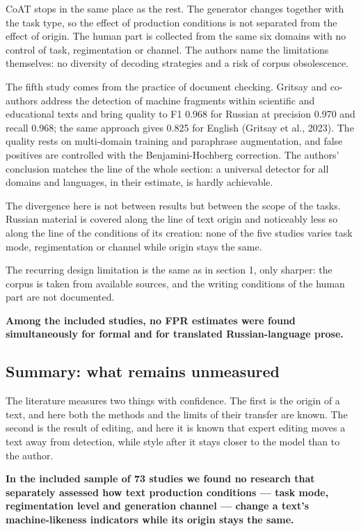 \documentclass[11pt,a4paper]{article}
\renewcommand{\_}{\textunderscore\allowbreak}
\begin{document}
CoAT stops in the same place as the rest. The generator changes together with
the task type, so the effect of production conditions is not separated from the
effect of origin. The human part is collected from the same six domains with no
control of task, regimentation or channel. The authors name the limitations
themselves: no diversity of decoding strategies and a risk of corpus obsolescence.

The fifth study comes from the practice of document checking. Gritsay and
co-authors address the detection of machine fragments within scientific and
educational texts and bring quality to F1 0.968 for Russian at precision 0.970
and recall 0.968; the same approach gives 0.825 for English (Gritsay et al., 2023). The quality rests on multi-domain training and
paraphrase augmentation, and false positives are controlled with the
Benjamini-Hochberg correction. The authors' conclusion matches the line of the
whole section: a universal detector for all domains and languages, in their
estimate, is hardly achievable.

The divergence here is not between results but between the scope of the tasks.
Russian material is covered along the line of text origin and noticeably less
so along the line of the conditions of its creation: none of the five studies
varies task mode, regimentation or channel while origin stays the same.

The recurring design limitation is the same as in section 1, only sharper: the
corpus is taken from available sources, and the writing conditions of the human
part are not documented.

\textbf{Among the included studies, no FPR estimates were found simultaneously for
formal and for translated Russian-language prose.}

\subsection{Summary: what remains unmeasured}

The literature measures two things with confidence. The first is the origin of
a text, and here both the methods and the limits of their transfer are known.
The second is the result of editing, and here it is known that expert editing
moves a text away from detection, while style after it stays closer to the
model than to the author.

\textbf{In the included sample of 73 studies we found no research that separately
assessed how text production conditions — task mode, regimentation level and
generation channel — change a text's machine-likeness indicators while its
origin stays the same.}
\end{document}
